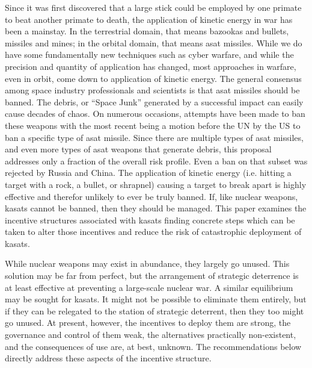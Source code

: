 
\maketitle

\pagestyle{execSummary}
\thispagestyle{firstPage}



Since it was first discovered that a large stick could be employed by
one primate to beat another primate to death, the application of
kinetic energy in war has been a mainstay.  In the terrestrial domain,
that means bazookas and bullets, missiles and mines; in the orbital
domain, that means \ac{asat} missiles.  While we do have some
fundamentally new techniques such as cyber warfare\cite{big-risks},
and while the precision and quantity of application has changed, most
approaches in warfare, even in orbit, come down to application of
kinetic energy.\cite{brian} The general consensus among space industry
professionals and scientists is that \ac{asat} missiles should be
banned.  The debris, or ``Space Junk'' generated by a successful
impact can easily cause decades of chaos.  On numerous occasions,
attempts have been made to ban these weapons with the most recent
being a motion before the UN by the US to ban a specific type of
\ac{asat} missile.  Since there are multiple types of \ac{asat}
missiles, and even more types of \ac{asat} weapons that generate
debris, this proposal addresses only a fraction of the overall risk
profile.  Even a ban on that subset was rejected by Russia and China.
The application of kinetic energy (i.e. hitting a target with a rock,
a bullet, or shrapnel) causing a target to break apart is highly
effective and therefor unlikely to ever be truly banned.  If, like
nuclear weapons, \acp{kasat} cannot be banned, then they should be
managed.  This paper examines the incentive structures associated with
\acp{kasat} finding concrete steps which can be taken to alter those
incentives and reduce the risk of catastrophic deployment of
\acp{kasat}.

While nuclear weapons may exist in abundance, they largely go unused.
This solution may be far from perfect, but the arrangement of
strategic deterrence is at least effective at preventing a large-scale
nuclear war.  A similar equilibrium may be sought for \acp{kasat}.  It
might not be possible to eliminate them entirely, but if they can be
relegated to the station of strategic deterrent, then they too might
go unused.  At present, however, the incentives to deploy them are
strong, the governance and control of them weak, the alternatives
practically non-existent, and the consequences of use are, at best,
unknown.  The recommendations below directly address these aspects of
the incentive structure.

